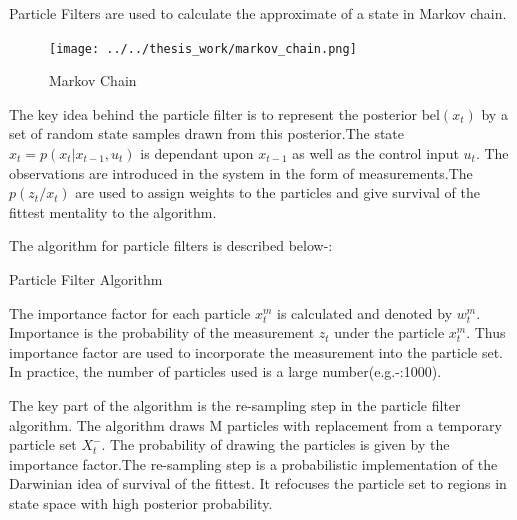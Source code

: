 \documentclass[12pt]{dalcsthesis}
\begin{document}
Particle Filters are used to calculate the approximate of a state in Markov chain.
\begin{figure}[hbtp]
\caption{Markov Chain}
\centering
\texttt{[image: ../../thesis\_work/markov\_chain.png]}
\end{figure}
The key idea behind the particle filter is to represent the posterior bel$(x_{t})$ by a set of random state samples drawn from this posterior.The state $ x _{t}=p(x_{t}|x_{t-1},u _{t})$ is dependant upon $ x _{t-1}$ as well as the control input $u _{t}$. The observations are introduced in the system in the form of measurements.The $p(z_{t}/x_{t})$ are used to assign weights to the particles and give survival of the fittest mentality to the algorithm.  

The algorithm for particle filters is described below-:

\begin{algorithm}[H]
\label{alg:ParticleFilter}
 \SetAlgoLined
  		 


\caption{Particle Filter Algorithm}
\end{algorithm}

The importance factor for each particle $x_{t}^{m}$ is calculated and denoted by $w_{t}^{m}$. Importance is the probability of the measurement $z_{t}$ under the particle $x_{t}^{m}$. Thus importance factor are used to incorporate the measurement into the particle set. In practice, the number of particles used is a large number(e.g.-:1000).

The key part of the algorithm is the re-sampling step in the particle filter algorithm. The algorithm draws M particles with replacement from a temporary particle set $X_{t}^{-}$. The probability of drawing the particles is given by the importance factor.The re-sampling step is a probabilistic implementation of the Darwinian idea of survival of the fittest. It refocuses the particle set to regions in state space with high posterior probability. 
\end{document}

